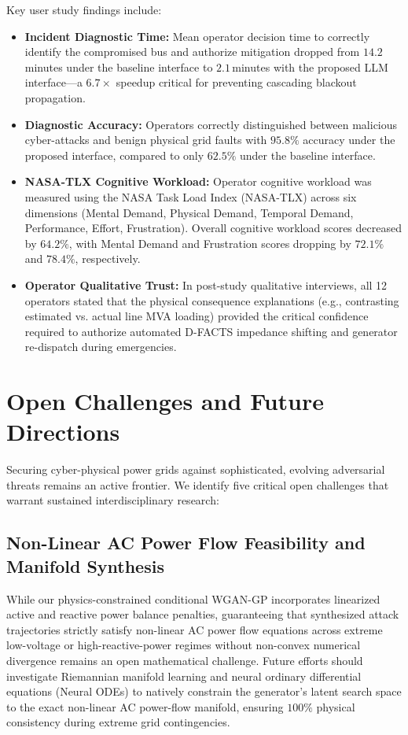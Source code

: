 \documentclass[journal,compsoc]{IEEEtran}
\begin{document}
Key user study findings include:
\begin{itemize}
    \item \textbf{Incident Diagnostic Time:} Mean operator decision time to correctly identify the compromised bus and authorize mitigation dropped from $14.2$\,minutes under the baseline interface to $2.1$\,minutes with the proposed LLM interface---a $6.7\times$ speedup critical for preventing cascading blackout propagation.
    \item \textbf{Diagnostic Accuracy:} Operators correctly distinguished between malicious cyber-attacks and benign physical grid faults with $95.8\%$ accuracy under the proposed interface, compared to only $62.5\%$ under the baseline interface.
    \item \textbf{NASA-TLX Cognitive Workload:} Operator cognitive workload was measured using the NASA Task Load Index (NASA-TLX) across six dimensions (Mental Demand, Physical Demand, Temporal Demand, Performance, Effort, Frustration). Overall cognitive workload scores decreased by $64.2\%$, with Mental Demand and Frustration scores dropping by $72.1\%$ and $78.4\%$, respectively.
    \item \textbf{Operator Qualitative Trust:} In post-study qualitative interviews, all 12 operators stated that the physical consequence explanations (e.g., contrasting estimated vs. actual line MVA loading) provided the critical confidence required to authorize automated D-FACTS impedance shifting and generator re-dispatch during emergencies.
\end{itemize}


\section{Open Challenges and Future Directions}
\label{sec:challenges}

Securing cyber-physical power grids against sophisticated, evolving adversarial threats remains an active frontier. We identify five critical open challenges that warrant sustained interdisciplinary research:

\subsection{Non-Linear AC Power Flow Feasibility and Manifold Synthesis}
While our physics-constrained conditional WGAN-GP incorporates linearized active and reactive power balance penalties, guaranteeing that synthesized attack trajectories strictly satisfy non-linear AC power flow equations across extreme low-voltage or high-reactive-power regimes without non-convex numerical divergence remains an open mathematical challenge. Future efforts should investigate Riemannian manifold learning and neural ordinary differential equations (Neural ODEs) to natively constrain the generator's latent search space to the exact non-linear AC power-flow manifold, ensuring $100\%$ physical consistency during extreme grid contingencies.
\end{document}
